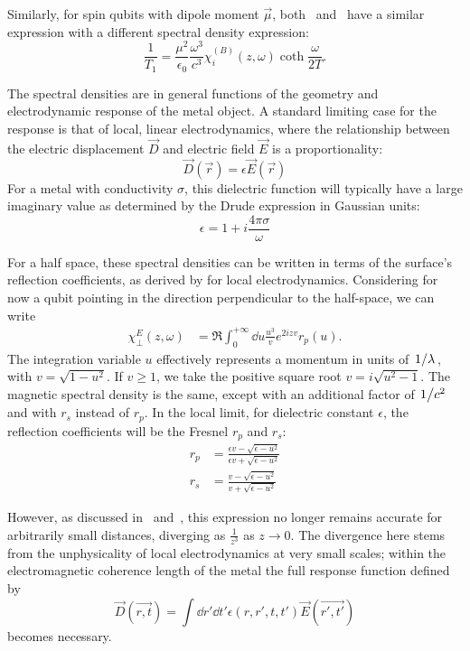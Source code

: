\documentclass{article}
\begin{document}
Similarly, for spin qubits with dipole moment $\vec{\mu}$, both~\cite{QubitRelax} and~\cite{Henkel1999} have a similar expression with a different spectral density expression:
\begin{equation}
	\frac{1}{T_1} = \frac{\mu^2}{\epsilon_0} \frac{\omega^3}{c^3} \chi_{i}^{(B)}(z, \omega) \coth\frac{\omega}{2 T}.
\end{equation}

The spectral densities are in general functions of the geometry and electrodynamic response of the metal object.
A standard limiting case for the response is that of local, linear electrodynamics, where the relationship between the electric displacement $\vec{D}$ and electric field $\vec{E}$ is a proportionality:
\begin{equation}
	\vec{D}(\vec{r}) = \epsilon \vec{E}(\vec{r})
\end{equation}
For a metal with conductivity $\sigma$, this dielectric function will typically have a large imaginary value as determined by the Drude expression in Gaussian units:
\begin{equation}
	\epsilon = 1 + i\frac{4 \pi \sigma}{\omega}
\end{equation}

For a half space, these spectral densities can be written in terms of the surface's reflection coefficients, as derived by\cite{Henkel1999} for local electrodynamics.
Considering for now a qubit pointing in the direction perpendicular to the half-space, we can write
\begin{align}
	\chi_\perp^E(z, \omega) &= \Re \int_0^{+\infty} \dd{u} \frac{u^3}{v} e^{2 i z v} r_p(u). \label{eq:chi}
\end{align}
The integration variable $u$ effectively represents a momentum in units of $\flatfrac{1}{\lambda}$, with $v = \sqrt{1 - u^2}$.
If $v \geq 1$, we take the positive square root $v = i \sqrt{u^2 - 1}$.
The magnetic spectral density is the same, except with an additional factor of $\flatfrac{1}{c^2}$ and with $r_s$ instead of $r_p$.
In the local limit, for dielectric constant $\epsilon$, the reflection coefficients will be the Fresnel $r_p$ and $r_s$:
\begin{align}
	r_p &= \frac{\epsilon v - \sqrt{\epsilon - u^2}}{\epsilon v + \sqrt{\epsilon - u^2}} \\
	r_s &= \frac{v - \sqrt{\epsilon - u^2}}{ v + \sqrt{\epsilon - u^2}}
\end{align}

However, as discussed in~\cite{QubitRelax} and~\cite{Henkel2006}, this expression no longer remains accurate for arbitrarily small distances, diverging as $\frac{1}{z^3}$ as $z \rightarrow 0$.
The divergence here stems from the unphysicality of local electrodynamics at very small scales;
within the electromagnetic coherence length of the metal the full response function defined by
\begin{equation}
	\vec{D}(\vec{r, t}) = \int \dd{r'} \dd{t'} \epsilon(r, r', t, t') \vec{E}(\vec{r', t'})
\end{equation}
becomes necessary.
\end{document}
